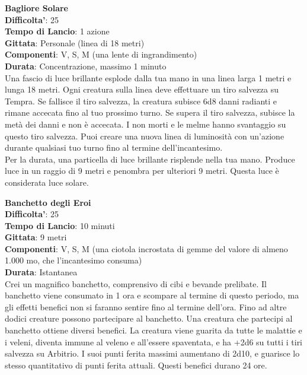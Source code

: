 \begin{multicols}{2}
\medskip\textbf{Bagliore Solare}\\
\textbf{Difficolta'}: 25\\
\textbf{Tempo di Lancio}: 1 azione\\
\textbf{Gittata}: Personale (linea di 18 metri)\\
\textbf{Componenti}: V, S, M (una lente di ingrandimento)\\
\textbf{Durata}: Concentrazione, massimo 1 minuto\\
Una fascio di luce brillante esplode dalla tua mano in una linea larga 1 metri e lunga 18 metri. Ogni creatura sulla linea deve effettuare un tiro salvezza su Tempra. Se fallisce il tiro salvezza, la creatura subisce 6d8 danni radianti e rimane accecata fino al tuo prossimo turno. Se supera il tiro salvezza, subisce la metà dei danni e non è accecata. I non morti e le melme hanno svantaggio su questo tiro salvezza. Puoi creare una nuova linea di luminosità con un’azione durante qualsiasi tuo turno fino al termine dell’incantesimo.\\
Per la durata, una particella di luce brillante risplende nella tua mano. Produce luce in un raggio di 9 metri e penombra per ulteriori 9 metri. Questa luce è considerata luce solare.


\medskip\textbf{Banchetto degli Eroi}\\
\textbf{Difficolta'}: 25\\
\textbf{Tempo di Lancio}: 10 minuti\\
\textbf{Gittata}: 9 metri\\
\textbf{Componenti}: V, S, M (una ciotola incrostata di gemme del valore di almeno 1.000 mo, che l’incantesimo consuma)\\
\textbf{Durata}: Istantanea\\
Crei un magnifico banchetto, comprensivo di cibi e bevande prelibate. Il banchetto viene consumato in 1 ora e scompare al termine di questo periodo, ma gli effetti benefici non si faranno sentire fino al termine dell’ora. Fino ad altre dodici creature possono
partecipare al banchetto. Una creatura che partecipi al banchetto ottiene diversi benefici. La creatura viene guarita da tutte le malattie e i veleni, diventa immune al veleno e all’essere
spaventata, e ha +2d6 su tutti i tiri salvezza su Arbitrio. I suoi punti ferita massimi aumentano di 2d10, e guarisce lo stesso quantitativo di punti ferita attuali. Questi benefici durano 24 ore. 


\end{multicols}
